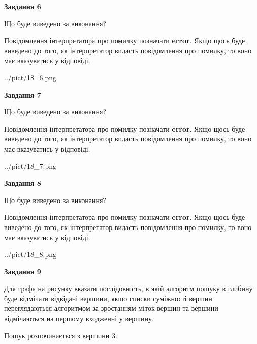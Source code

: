 \documentclass[12pt, ukrainian]{article}
\begin{document}
{\begin {large}
{\begin {center}\textbf{Завдання 6}\end {center}}\par
Що буде виведено за виконання?

Повідомлення інтерпретатора про помилку позначати \textbf{error}.
Якщо щось буде виведено до того, як інтерпретатор видасть повідомлення про помилку, 
то воно має вказуватись у відповіді. \par


\begin{center}
	{../pict/18_6.png}
\end{center}
\newpage

{\begin {center}\textbf{Завдання 7}\end {center}}\par
Що буде виведено за виконання?

Повідомлення інтерпретатора про помилку позначати \textbf{error}.
Якщо щось буде виведено до того, як інтерпретатор видасть повідомлення про помилку, 
то воно має вказуватись у відповіді. \par


\begin{center}
	{../pict/18_7.png}
\end{center}
\newpage

{\begin {center}\textbf{Завдання 8}\end {center}}\par
Що буде виведено за виконання?

Повідомлення інтерпретатора про помилку позначати \textbf{error}.
Якщо щось буде виведено до того, як інтерпретатор видасть повідомлення про помилку, 
то воно має вказуватись у відповіді. \par


\begin{center}
	{../pict/18_8.png}
\end{center}
\newpage

{\begin {center}\textbf{Завдання 9}\end {center}}\par
Для графа на рисунку вказати послідовність, в якій алгоритм пошуку в глибину буде відмічати відвідані вершини, якщо списки суміжності вершин переглядаються алгоритмом за зростанням міток вершин та вершини відмічаються на першому вход\-женні у вершину.\par
Пошук розпочинається з вершини 3.\par


\end{large}}
\end{document}
